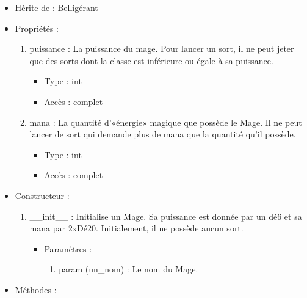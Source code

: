 \documentclass[12pt,pdftex,oneside]{article}
\begin{document}
  \begin{itemize}
  \item Hérite de : Belligérant
  \item Propriétés : 
    \begin{enumerate}
    \item puissance : La puissance du mage. Pour lancer un sort, il ne peut
      jeter que des sorts dont la classe est inférieure ou égale à sa puissance.
          \begin{itemize}
          \item Type : int
          \item Accès : complet
          \end{itemize}
    \item mana : La quantité d'«énergie» magique que possède le Mage. Il ne peut
      lancer de sort qui demande plus de mana que la quantité qu'il possède.
          \begin{itemize}
          \item Type : int
          \item Accès : complet
          \end{itemize}
    \end{enumerate}

  \item Constructeur : 

  \begin{enumerate}
  \item \_\_init\_\_ : Initialise un Mage. Sa puissance est donnée par un dé6 et
    sa mana par 2xDé20. Initialement, il ne possède aucun sort.
    \begin{itemize}
    \item Paramètres : 
      \begin{enumerate}
      \item param (un\_nom) : Le nom du Mage.
      \end{enumerate}
    \end{itemize}
  \end{enumerate}

  \item Méthodes : 


\end{itemize}
\end{document}
